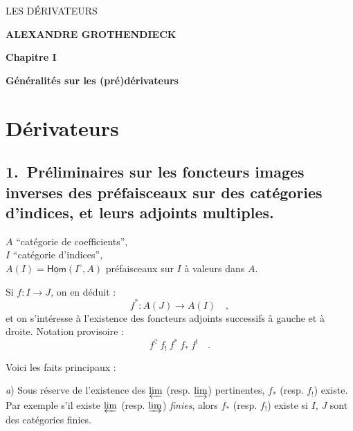 \documentclass[11pt]{article}
\newcommand{\printedpage}[1]{\marginpar{\footnotesize p.~#1}}
\newcommand{\msp}[1]{\marginpar{\footnotesize [#1]}}
\newcommand{\uHom}{\underline{\mathsf{Hom}}}
\begin{document}
\printedpage{--} %

\begin{center}
{\Large\textsf{LES DÉRIVATEURS}}

\bigskip

\textbf{ALEXANDRE GROTHENDIECK}

\bigskip\bigskip

\textbf{Chapitre I}

\medskip

\textbf{Généralités sur les (pré)dérivateurs}
\end{center}

\clearpage

\printedpage{--} %


\clearpage

\printedpage{1}

\msp{page 1}

\section*{Dérivateurs}

\subsection*{\textmd{1.}\ Préliminaires sur les foncteurs images inverses des préfaisceaux sur des catégories d'indices, et leurs adjoints multiples.}

$A$ “catégorie de coefficients”,\\
$I$ “catégorie d'indices”,\\
$A(I)=\uHom(I^{\circ},A)$ préfaisceaux sur $I$ à valeurs dans $A$.

Si $f : I \to J$, on en déduit :
\[
f^{*} : A(J) \to A(I) \quad ,
\]
et on s'intéresse à l'existence des foncteurs adjoints successifs à gauche et à droite. Notation provisoire :
\[
f^{?}\ f_{!}\ f^{*}\ f_{*}\ f^{!} \quad .
\]

Voici les faits principaux :

\textit{a}) Sous réserve de l'existence des $\varprojlim$ (resp. $\varinjlim$) pertinentes, $f_{*}$ (resp. $f_{!}$) existe. Par exemple s'il existe $\varprojlim$ (resp. $\varinjlim$) \textit{finies}, alors $f_{*}$ (resp. $f_{!}$) existe si $I$, $J$ sont des catégories finies.
\end{document}
